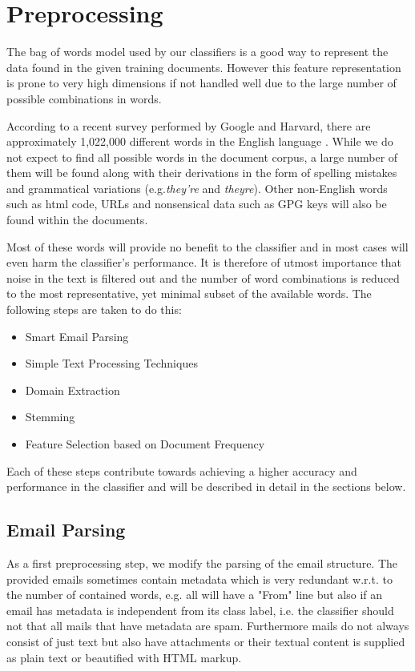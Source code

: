 \section{Preprocessing}
The bag of words model used by our classifiers is a good way to represent the data found in the given training documents. However this feature representation is prone to very high dimensions if not handled well due to the large number of possible combinations in words. 

According to a recent survey performed by Google and Harvard, there are approximately 1,022,000 different words in the English language \cite{google2010words}. While we do not expect to find all possible words in the document corpus, a large number of them will be found along with their derivations in the form of spelling mistakes and grammatical variations (e.g.{\it they're} and {\it theyre}). Other non-English words such as html code, URLs and nonsensical data such as GPG keys will also be found within the documents.

Most of these words will provide no benefit to the classifier and in most cases will even harm the classifier's performance. It is therefore of utmost importance that noise in the text is filtered out and the number of word combinations is reduced to the most representative, yet minimal subset of the available words. The following steps are taken to do this:
\begin{itemize}
	\item Smart Email Parsing
	\item Simple Text Processing Techniques
	\item Domain Extraction
	\item Stemming
	\item Feature Selection based on Document Frequency
\end{itemize}

Each of these steps contribute towards achieving a higher accuracy and performance in the classifier and will be described in detail in the sections below.

\subsection{Email Parsing}
As a first preprocessing step, we modify the parsing of the email structure.
The provided emails sometimes contain metadata which is very redundant w.r.t. to the number of contained words, e.g. all will have a "From" line but also if an email has metadata is independent from its class label, i.e. the classifier should not that all mails that have metadata are spam.
Furthermore mails do not always consist of just text but also have attachments or their textual content is supplied as plain text or beautified with HTML markup.

